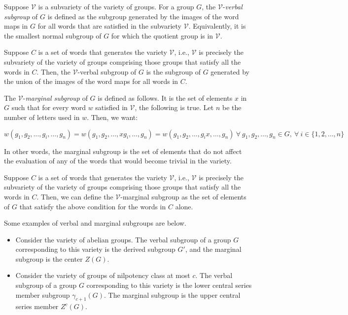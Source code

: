 Suppose $\mathcal{V}$ is a subvariety of the variety of groups. For a
group $G$, the $\mathcal{V}$-{\em verbal subgroup} of $G$ is defined
as the subgroup generated by the images of the word maps in $G$ for
all words that are satisfied in the subvariety
$\mathcal{V}$. Equivalently, it is the smallest normal subgroup of $G$
for which the quotient group is in $\mathcal{V}$.

Suppose $C$ is a set of words that generates the variety
$\mathcal{V}$, i.e., $\mathcal{V}$ is precisely the subvariety of the
variety of groups comprising those groups that satisfy all the words
in $C$. Then, the $\mathcal{V}$-verbal subgroup of $G$ is the subgroup
of $G$ generated by the union of the images of the word maps for all
words in $C$.

The $\mathcal{V}$-{\em marginal subgroup} of $G$ is defined as
follows. It is the set of elements $x$ in $G$ such that for every word
$w$ satisfied in $\mathcal{V}$, the following is true. Let $n$ be the number of letters used in $w$. Then, we want:

\begin{small}
$w(g_1,g_2,\dots,g_i, \dots,g_n) = w(g_1,g_2,\dots,xg_i,\dots,g_n) = w(g_1,g_2,\dots,g_ix,\dots,g_n) \ \forall \ g_1,g_2,\dots,g_n \in G, \ \forall \ i \in \{ 1,2,\dots,n\}$
\end{small}

In other words, the marginal subgroup is the set of elements that do not
affect the evaluation of any of the words that would become trivial in
the variety.

Suppose $C$ is a set of words that generates the variety
$\mathcal{V}$, i.e., $\mathcal{V}$ is precisely the subvariety of the
variety of groups comprising those groups that satisfy all the words
in $C$. Then, we can define the $\mathcal{V}$-marginal subgroup as the
set of elements of $G$ that satisfy the above condition for the words
in $C$ alone.

Some examples of verbal and marginal subgroups are below.

\begin{itemize}
\item Consider the variety of abelian groups. The verbal subgroup of a
  group $G$ corresponding to this variety is the derived subgroup
  $G'$, and the marginal subgroup is the center $Z(G)$.
\item Consider the variety of groups of nilpotency class at most
  $c$. The verbal subgroup of a group $G$ corresponding to this
  variety is the lower central series member subgroup
  $\gamma_{c+1}(G)$. The marginal subgroup is the upper central series
  member $Z^c(G)$.
\end{itemize}

